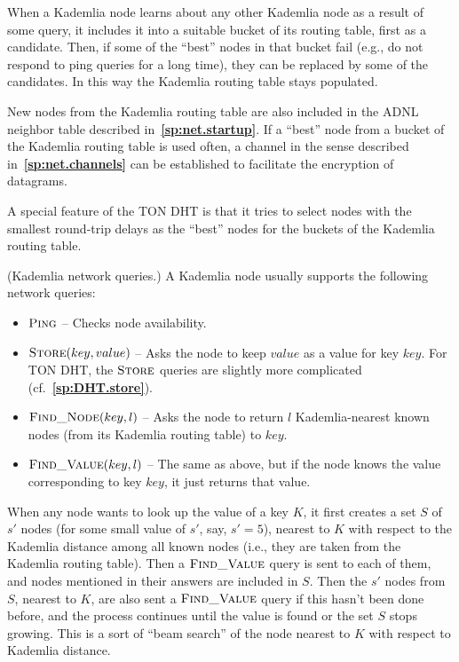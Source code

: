 \documentclass[12pt,oneside]{article}
\def\makepoint#1{\medbreak\noindent{\bf #1.\ }}
\def\nxsubpoint{\refstepcounter{subsubsection}%
  \smallbreak\makepoint{\thesubsubsection}}
\def\refpoint#1{{\rm\textbf{\ref{#1}}}}
\let\ptref=\refpoint
\def\opsc#1{\operatorname{\textsc{#1}}}
\def\Ping{\opsc{Ping}}
\def\Store{\opsc{Store}}
\def\FindNode{\opsc{Find\_Node}}
\def\FindValue{\opsc{Find\_Value}}
\begin{document}
When a Kademlia node learns about any other Kademlia node as a result
of some query, it includes it into a suitable bucket of its routing
table, first as a candidate. Then, if some of the ``best'' nodes in
that bucket fail (e.g., do not respond to ping queries for a long
time), they can be replaced by some of the candidates. In this way the
Kademlia routing table stays populated.

New nodes from the Kademlia routing table are also included in the
ADNL neighbor table described in~\ptref{sp:net.startup}. If a ``best''
node from a bucket of the Kademlia routing table is used often, a
channel in the sense described in~\ptref{sp:net.channels} can be
established to facilitate the encryption of datagrams.

A special feature of the TON DHT is that it tries to select nodes with
the smallest round-trip delays as the ``best'' nodes for the buckets
of the Kademlia routing table.

\nxsubpoint (Kademlia network queries.)  A Kademlia node usually
supports the following network queries:
\begin{itemize}
\item $\Ping$ -- Checks node availability.
\item $\Store(key,value)$ -- Asks the node to keep $value$ as a value
  for key $key$. For TON DHT, the $\Store$ queries are slightly more
  complicated (cf.~\ptref{sp:DHT.store}).
\item $\FindNode(key,l)$ -- Asks the node to return $l$
  Kademlia-nearest known nodes (from its Kademlia routing table) to
  $key$.
\item $\FindValue(key,l)$ -- The same as above, but if the node knows
  the value corresponding to key $key$, it just returns that value.
\end{itemize}

When any node wants to look up the value of a key $K$, it first
creates a set $S$ of $s'$ nodes (for some small value of $s'$, say,
$s'=5$), nearest to $K$ with respect to the Kademlia distance among
all known nodes (i.e., they are taken from the Kademlia routing
table). Then a $\FindValue$ query is sent to each of them, and nodes
mentioned in their answers are included in $S$. Then the $s'$ nodes
from $S$, nearest to $K$, are also sent a $\FindValue$ query if this
hasn't been done before, and the process continues until the value is
found or the set $S$ stops growing. This is a sort of ``beam search''
of the node nearest to $K$ with respect to Kademlia distance.
\end{document}
